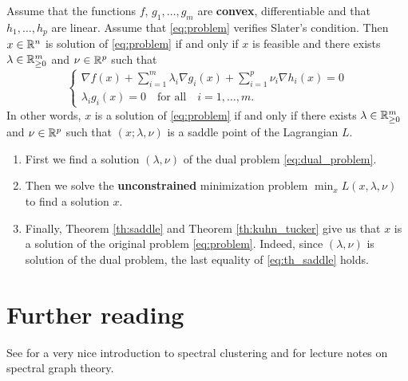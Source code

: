 \documentclass[11pt,nocut]{article}
\begin{document}
\begin{theorem}\label{th:kuhn_tucker}
	Assume that the functions $f$, $g_1, \dots, g_m$ are \textbf{convex}, differentiable and that $h_1, \dots, h_p$ are linear. Assume that \eqref{eq:problem} verifies Slater's condition.
	Then 
	$x \in \mathbb{R}^n$ is solution of \eqref{eq:problem} if and only if $x$ is feasible and there exists $\lambda \in \mathbb{R}_{\geq 0}^m$ and $\nu \in \mathbb{R}^p$ such that
	\begin{equation}\label{eq:kkt}
		\begin{cases}
			\displaystyle \nabla f(x) + \sum_{i=1}^m \lambda_i \nabla g_i(x) + \sum_{i=1}^p \nu_i \nabla h_i(x) = 0 \\
		\lambda_i g_i(x) = 0 \quad \text{for all} \quad i=1, \dots, m.
		\end{cases}
	\end{equation}
	In other words, $x$ is a solution of \eqref{eq:problem} if and only if there exists $\lambda \in \mathbb{R}_{\geq 0}^m$ and $\nu \in \mathbb{R}^p$ such that $(x; \lambda, \nu)$ is a saddle point of the Lagrangian $L$.
\end{theorem}

\begin{enumerate}
	\item First we find a solution $(\lambda,\nu)$ of the dual problem \eqref{eq:dual_problem}.
	\item Then we solve the \textbf{unconstrained} minimization problem $\min_x L(x,\lambda,\nu)$ to find a solution $x$.
	\item Finally, Theorem \ref{th:saddle} and Theorem \ref{th:kuhn_tucker} give us that $x$ is a solution of the original problem \eqref{eq:problem}. Indeed, since $(\lambda,\nu)$ is solution of the dual problem, the last equality of \eqref{eq:th_saddle} holds.
\end{enumerate}

\section*{Further reading}

See \cite{von2007tutorial} for a very nice introduction to spectral clustering and \cite{spielman2012spectral} for lecture notes on spectral graph theory.

\vspace{1cm}
\centerline{}




\end{document}
